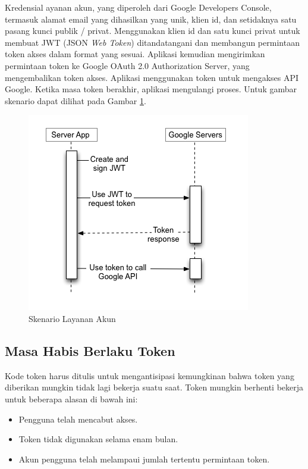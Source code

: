 Kredensial ayanan akun, yang diperoleh dari Google Developers Console, termasuk
alamat email yang dihasilkan yang unik, klien id, dan setidaknya satu pasang
kunci publik / privat. Menggunakan klien id dan satu kunci privat untuk membuat
JWT (JSON {\it Web Token}) ditandatangani dan membangun permintaan token akses
dalam format yang sesuai. Aplikasi kemudian mengirimkan permintaan token ke
Google OAuth 2.0 Authorization Server, yang mengembalikan token akses. Aplikasi
menggunakan token untuk mengakses API Google. Ketika masa token berakhir,
aplikasi mengulangi proses. Untuk gambar skenario dapat dilihat pada Gambar
\ref{fig:skenariolayananakun}.

\begin{figure}[H]
\centering
\includegraphics[scale=0.8]{Gambar/skenario4.png}
\caption[Skenario Layanan Akun]{Skenario Layanan Akun}
\label{fig:skenariolayananakun}
\end{figure}

\subsection{Masa Habis Berlaku Token}
Kode token harus ditulis untuk mengantisipasi kemungkinan bahwa token yang
diberikan mungkin tidak lagi bekerja suatu saat. Token mungkin berhenti bekerja
untuk beberapa alasan di bawah ini:

\begin{itemize}
\item
Pengguna telah mencabut akses.
\item
Token tidak digunakan selama enam bulan.
\item
Akun pengguna telah melampaui jumlah tertentu permintaan token.
\end{itemize}

